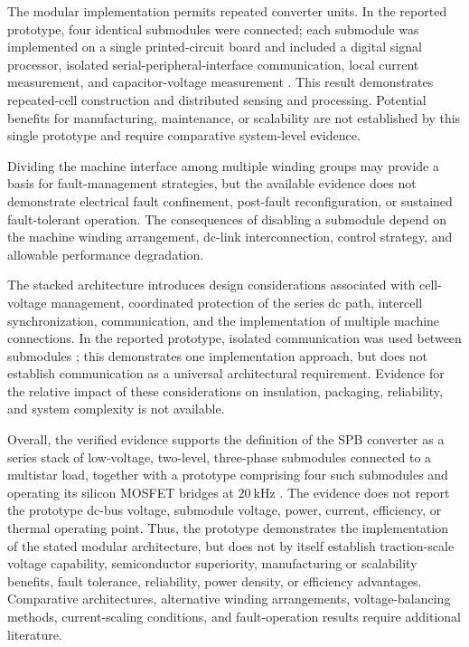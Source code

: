 The modular implementation permits repeated converter units. In the reported prototype, four identical submodules were connected; each submodule was implemented on a single printed-circuit board and included a digital signal processor, isolated serial-peripheral-interface communication, local current measurement, and capacitor-voltage measurement \cite{Jin2017}. This result demonstrates repeated-cell construction and distributed sensing and processing. Potential benefits for manufacturing, maintenance, or scalability are not established by this single prototype and require comparative system-level evidence.

Dividing the machine interface among multiple winding groups may provide a basis for fault-management strategies, but the available evidence does not demonstrate electrical fault confinement, post-fault reconfiguration, or sustained fault-tolerant operation. The consequences of disabling a submodule depend on the machine winding arrangement, dc-link interconnection, control strategy, and allowable performance degradation.

The stacked architecture introduces design considerations associated with cell-voltage management, coordinated protection of the series dc path, intercell synchronization, communication, and the implementation of multiple machine connections. In the reported prototype, isolated communication was used between submodules \cite{Jin2017}; this demonstrates one implementation approach, but does not establish communication as a universal architectural requirement. Evidence for the relative impact of these considerations on insulation, packaging, reliability, and system complexity is not available.

Overall, the verified evidence supports the definition of the SPB converter as a series stack of low-voltage, two-level, three-phase submodules connected to a multistar load, together with a prototype comprising four such submodules and operating its silicon MOSFET bridges at \(20~\mathrm{kHz}\) \cite{Jin2017}. The evidence does not report the prototype dc-bus voltage, submodule voltage, power, current, efficiency, or thermal operating point. Thus, the prototype demonstrates the implementation of the stated modular architecture, but does not by itself establish traction-scale voltage capability, semiconductor superiority, manufacturing or scalability benefits, fault tolerance, reliability, power density, or efficiency advantages. Comparative architectures, alternative winding arrangements, voltage-balancing methods, current-scaling conditions, and fault-operation results require additional literature.
